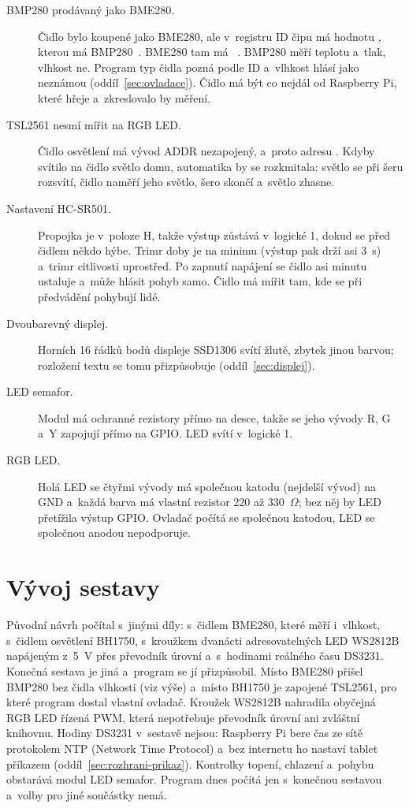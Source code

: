\begin{description}
  \item[BMP280 prodávaný jako BME280.] Čidlo bylo koupené jako BME280, ale v~registru ID čipu
         má hodnotu , kterou má BMP280~\cite{bmp280}. BME280 tam má
        ~\cite{bme280}. BMP280 měří teplotu a~tlak, vlhkost ne. Program typ čidla
        pozná podle ID a~vlhkost hlásí jako neznámou (oddíl~\ref{sec:ovladace}). Čidlo má být
        co nejdál od Raspberry Pi, které hřeje a~zkreslovalo by měření.
  \item[TSL2561 nesmí mířit na RGB LED.] Čidlo osvětlení má vývod ADDR nezapojený, a~proto
        adresu . Kdyby svítilo na čidlo světlo domu, automatika by se rozkmitala:
        světlo se při šeru rozsvítí, čidlo naměří jeho světlo, šero skončí a~světlo zhasne.
  \item[Nastavení HC-SR501.] Propojka je v~poloze H, takže výstup zůstává v~logické 1, dokud se
        před čidlem někdo hýbe. Trimr doby je na minimu (výstup pak drží asi 3~s) a~trimr
        citlivosti uprostřed. Po zapnutí napájení se čidlo asi minutu ustaluje a~může hlásit
        pohyb samo. Čidlo má mířit tam, kde se při předvádění pohybují lidé.
  \item[Dvoubarevný displej.] Horních 16 řádků bodů displeje SSD1306 svítí žlutě, zbytek jinou
        barvou; rozložení textu se tomu přizpůsobuje (oddíl~\ref{sec:displej}).
  \item[LED semafor.] Modul má ochranné rezistory přímo na desce, takže se jeho vývody R, G a~Y
        zapojují přímo na GPIO. LED svítí v~logické 1.
  \item[RGB LED.] Holá LED se čtyřmi vývody má společnou katodu (nejdelší vývod) na GND a~každá
        barva má vlastní rezistor 220 až 330~$\Omega$; bez něj by LED přetížila výstup GPIO.
        Ovladač počítá se společnou katodou, LED se společnou anodou nepodporuje.
\end{description}

\section{Vývoj sestavy}
\label{sec:vyvoj-sestavy}

Původní návrh počítal s~jinými díly: s~čidlem BME280, které měří i~vlhkost, s~čidlem osvětlení
BH1750, s~kroužkem dvanácti adresovatelných LED WS2812B napájeným z~5~V přes převodník úrovní
a~s~hodinami reálného času DS3231. Konečná sestava je jiná a~program se jí přizpůsobil.
Místo BME280 přišel BMP280 bez čidla vlhkosti (viz výše) a~místo BH1750 je zapojené TSL2561,
pro které program dostal vlastní ovladač. Kroužek WS2812B nahradila obyčejná RGB LED řízená PWM,
která nepotřebuje převodník úrovní ani zvláštní knihovnu. Hodiny DS3231 v~sestavě nejsou:
Raspberry Pi bere čas ze sítě protokolem NTP (Network Time Protocol) a~bez internetu ho nastaví
tablet příkazem  (oddíl~\ref{sec:rozhrani-prikaz}). Kontrolky
topení, chlazení a~pohybu obstarává modul LED semafor. Program dnes počítá jen s~konečnou
sestavou a~volby pro jiné součástky nemá.
